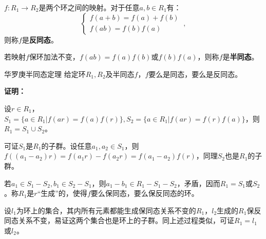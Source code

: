 
\begin{definition}{}
$f:R_1\rightarrow R_2$是两个环之间的映射。对于任意$a,b\in R_1$有：
\begin{equation}
\left\{\begin{array}{c}
f(a+b)=f(a)+f(b) \\
f(a b)=f(b)f(a)
\end{array}\right.
~,\end{equation}
则称$f$是\textbf{反同态}。

若映射$f$保环加法不变，$f(ab)=f(a)f(b)$或$f(b)f(a)$，则称$f$是\textbf{半同态}。
\end{definition}
\begin{theorem}{华罗庚半同态定理}
给定环$R_1,R_2$及半同态$f$，$f$要么是同态，要么是反同态。
\end{theorem}
\textbf{证明：}

设$r\in R_1$，$S_1=\{a\in R_1|f(ar)=f(a)f(r)\},S_2=\{a\in R_1|f(ar)=f(r)f(a)\}$，则$R_1=S_1\cup S_2$。

可证$S_1$是$R_1$的子群。设任意$a_1,a_2\in S_1$，则$f((a_1-a_2)r)=f(a_1r)-f(a_2r)=f(a_1-a_2)f(r)$，同理$S_2$也是$R_1$的子群。

若$a_1\in S_1-S_2,b_1\in S_2-S_1$，则$a_1-b_1\in R_1-S_1-S_2$，矛盾，因而$R_1=S_1$或$S_2$。称$R_1$是$r$“生成”的，使得$f$要么保同态，要么保反同态的环。

设$l_1$为环上的集合，其内所有元素都能生成保同态关系不变的$R_1$，$l_2$生成的$R_1$保反同态关系不变，易证这两个集合也是环上的子群。同上述过程类似，可证$R_1=l_1$或$l_2$。

